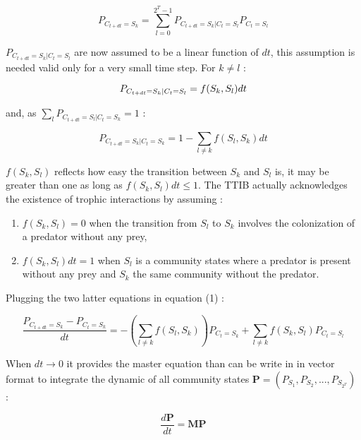 \begin{equation}
P_{C_{t+dt}=S_{k}}= \sum_{l=0}^{2^T-1} P_{C_{t+dt}=S_k|C_{t}=S_l}P_{C_{t}=S_l}
\end{equation}

\(P_{C_{t+dt}=S_k|C_{t}=S_l}\) are now assumed to be a linear function
of \(dt\), this assumption is needed valid only for a very small time
step. For \(k \neq l\) :

\begin{equation}
P_{C_{t+dt}=S_k|C_{t}=S_l} = f(S_k,S_l)dt \\
\end{equation}

and, as \(\sum_l P_{C_{t+dt}=S_l|C_{t}=S_k} = 1\) :

\begin{equation}
P_{C_{t+dt}=S_k|C_{t}=S_k} = 1-\sum_{l \neq k}f(S_l,S_k)dt
\end{equation}

\(f(S_k,S_l)\) reflects how easy the transition between \(S_k\) and
\(S_l\) is, it may be greater than one as long as
\(f(S_k,S_l)dt\leqslant1\). The TTIB actually acknowledges the existence
of trophic interactions by assuming :

\begin{enumerate}
\def\labelenumi{\arabic{enumi}.}
\tightlist
\item
  \(f(S_k,S_l)=0\) when the transition from \(S_l\) to \(S_k\) involves
  the colonization of a predator without any prey,
\item
  \(f(S_k,S_l)dt=1\) when \(S_l\) is a community states where a predator
  is present without any prey and \(S_k\) the same community without the
  predator.
\end{enumerate}

Plugging the two latter equations in equation (1) :

\begin{equation}
\frac{P_{C_{t+dt}=S_{k}}-P_{C_{t}=S_{k}}}{dt} = -\left(\sum_{l \neq k}f(S_l,S_k)\right)P_{C_{t}=S_{k}} + \sum_{l \neq k}f(S_k,S_l)P_{C_{t}=S_{l}}
\end{equation}

When \(dt \rightarrow 0\) it provides the master equation than can be
write in in vector format to integrate the dynamic of all community
states \(\mathbf{P}=(P_{S_1}, P_{S_2}, ..., P_{S_{2^T}})\) :

\begin{equation}
\frac{d\mathbf{P}}{dt} = \mathbf{M}\mathbf{P}
\end{equation}

